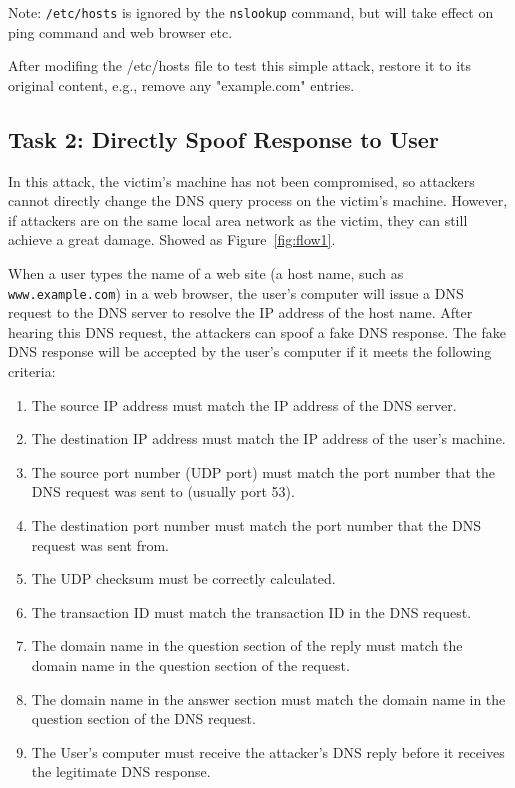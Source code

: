 Note: \texttt{/etc/hosts} is ignored by the {\tt nslookup} command, 
but will take effect on ping command and web browser etc.

After modifing the /etc/hosts file to test this simple attack, restore it
to its original content, e.g., remove any "example.com" entries.

\subsection{Task 2: Directly Spoof Response to User}

In this attack, the victim's machine has not been compromised, so attackers cannot
directly change the DNS query process on the victim's machine. However,
if attackers are on the same local area network as the victim, they 
can still achieve a great damage. Showed as Figure~\ref{fig:flow1}.

When a user types the name of a web site (a host name, such as {\tt www.example.com})
in a web browser, the user's computer will issue a DNS request to the DNS 
server to resolve the IP address of the host name.  After hearing this DNS 
request, the attackers can spoof a fake DNS response\cite{bib6}. The fake DNS response 
will be accepted by the user's computer if it meets 
the following criteria:

\begin{enumerate}

\item The source IP address must match the IP address of the DNS server.

\item The destination IP address must match the IP address of the user's machine.

\item The source port number (UDP port) must match the port number that the DNS
request was sent to (usually port 53).

\item The destination port number must match the port number that the DNS
request was sent from.

\item The UDP checksum must be correctly calculated. 

\item The transaction ID must match the transaction ID in the DNS request.

\item The domain name in the question section of the reply must match the 
domain name in the question section of the request.

\item The domain name in the answer section must match the domain name in the
question section of the DNS request.

\item The User's computer must receive the attacker's DNS reply before it
receives the legitimate DNS response.
\end{enumerate}


